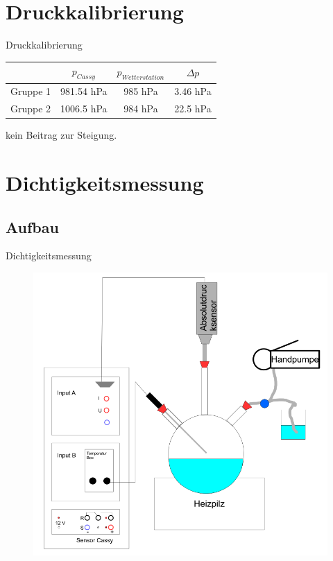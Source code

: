 \documentclass[11pt]{beamer}
\begin{document}
\section{Druckkalibrierung}
\begin{frame}{Druckkalibrierung}
\begin{table}[H]\centering
\begin{tabular}{|c|c|c|c|}
\hline 
 & $p_{Cassy}$ & $p_{Wetterstation}$ & $\Delta p$ \\ 
\hline 
Gruppe 1 & 981.54 hPa & 985 hPa & 3.46 hPa \\ 
\hline 
Gruppe 2 & 1006.5 hPa & 984 hPa & 22.5 hPa \\ 
\hline 
\end{tabular} 
\end{table}
kein Beitrag zur Steigung.
\end{frame}

\section{Dichtigkeitsmessung}

\subsection{Aufbau}
\begin{frame}{Dichtigkeitsmessung}
\begin{figure}[H]
\centering
\includegraphics[scale=0.4]{Bilder/Versuchsskizze.PNG}
\end{figure}

\end{frame}
\end{document}

